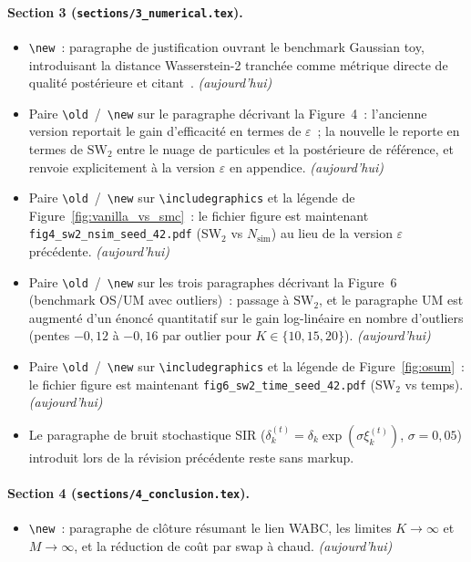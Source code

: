 \documentclass[11pt]{article}
\begin{document}
\paragraph{Section 3 (\texttt{sections/3\_numerical.tex}).}
\begin{itemize}[nosep]
    \item \texttt{\textbackslash new}~: paragraphe de justification ouvrant le benchmark Gaussian
    toy, introduisant la distance Wasserstein-2 tranchée comme métrique directe de qualité
    postérieure et citant~\cite{bonneel2015sliced,nadjahi2020statistical,nadjahi2020approximate}.
    \textit{(aujourd'hui)}
    \item Paire \texttt{\textbackslash old}~/~\texttt{\textbackslash new} sur le paragraphe
    décrivant la Figure~4~: l'ancienne version reportait le gain d'efficacité en termes de
    $\varepsilon$~; la nouvelle le reporte en termes de $\mathrm{SW}_2$ entre le nuage de
    particules et la postérieure de référence, et renvoie explicitement à la version $\varepsilon$
    en appendice. \textit{(aujourd'hui)}
    \item Paire \texttt{\textbackslash old}~/~\texttt{\textbackslash new} sur
    \texttt{\textbackslash includegraphics} et la légende de Figure~\ref{fig:vanilla_vs_smc}~: le
    fichier figure est maintenant \texttt{fig4\_sw2\_nsim\_seed\_42.pdf} (SW$_2$ vs
    $N_{\mathrm{sim}}$) au lieu de la version $\varepsilon$ précédente. \textit{(aujourd'hui)}
    \item Paire \texttt{\textbackslash old}~/~\texttt{\textbackslash new} sur les trois
    paragraphes décrivant la Figure~6 (benchmark OS/UM avec outliers)~: passage à
    $\mathrm{SW}_2$, et le paragraphe UM est augmenté d'un énoncé quantitatif sur le gain
    log-linéaire en nombre d'outliers (pentes $-0,12$ à $-0,16$ par outlier pour
    $K\in\{10,15,20\}$). \textit{(aujourd'hui)}
    \item Paire \texttt{\textbackslash old}~/~\texttt{\textbackslash new} sur
    \texttt{\textbackslash includegraphics} et la légende de Figure~\ref{fig:osum}~: le fichier
    figure est maintenant \texttt{fig6\_sw2\_time\_seed\_42.pdf} (SW$_2$ vs temps).
    \textit{(aujourd'hui)}
    \item Le paragraphe de bruit stochastique SIR ($\delta_k^{(t)} = \delta_k \exp(\sigma\xi_k^{(t)})$,
    $\sigma=0,05$) introduit lors de la révision précédente reste sans markup.
\end{itemize}

\paragraph{Section 4 (\texttt{sections/4\_conclusion.tex}).}
\begin{itemize}[nosep]
    \item \texttt{\textbackslash new}~: paragraphe de clôture résumant le lien WABC, les limites
    $K\to\infty$ et $M\to\infty$, et la réduction de coût par swap à chaud. \textit{(aujourd'hui)}
\end{itemize}
\end{document}
